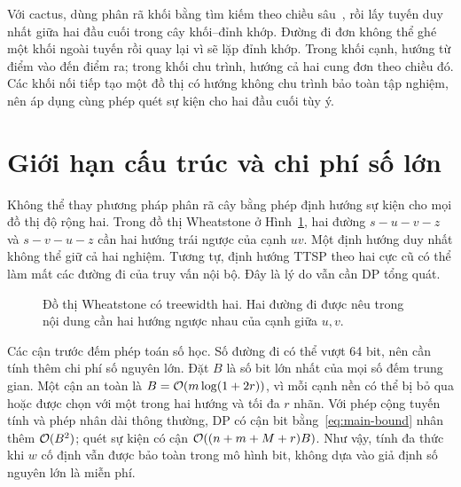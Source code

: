 Với cactus, dùng phân rã khối bằng tìm kiếm theo chiều sâu~\cite{tarjan1972}, rồi lấy tuyến duy nhất giữa hai đầu cuối trong cây khối--đỉnh khớp. Đường đi đơn không thể ghé một khối ngoài tuyến rồi quay lại vì sẽ lặp đỉnh khớp. Trong khối cạnh, hướng từ điểm vào đến điểm ra; trong khối chu trình, hướng cả hai cung đơn theo chiều đó. Các khối nối tiếp tạo một đồ thị có hướng không chu trình bảo toàn tập nghiệm, nên áp dụng cùng phép quét sự kiện cho hai đầu cuối tùy ý.

\section{Giới hạn cấu trúc và chi phí số lớn}

Không thể thay phương pháp phân rã cây bằng phép định hướng sự kiện cho mọi đồ thị độ rộng hai. Trong đồ thị Wheatstone ở Hình~\ref{fig:wheatstone}, hai đường $s-u-v-z$ và $s-v-u-z$ cần hai hướng trái ngược của cạnh $uv$. Một định hướng duy nhất không thể giữ cả hai nghiệm. Tương tự, định hướng TTSP theo hai cực cũ có thể làm mất các đường đi của truy vấn nội bộ. Đây là lý do vẫn cần DP tổng quát.

\begin{figure}[htbp]{Đồ thị Wheatstone có treewidth hai. Hai đường đi được nêu trong nội dung cần hai hướng ngược nhau của cạnh giữa $u,v$.}
\label{fig:wheatstone}
\centering
{}
\end{figure}

Các cận trước đếm phép toán số học. Số đường đi có thể vượt 64 bit, nên cần tính thêm chi phí số nguyên lớn. Đặt $B$ là số bit lớn nhất của mọi số đếm trung gian. Một cận an toàn là $B=\mathcal{O}(m\log(1+2r))$, vì mỗi cạnh nền có thể bị bỏ qua hoặc được chọn với một trong hai hướng và tối đa $r$ nhãn. Với phép cộng tuyến tính và phép nhân dài thông thường, DP có cận bit bằng~\eqref{eq:main-bound} nhân thêm $\mathcal{O}(B^2)$; quét sự kiện có cận $\mathcal{O}((n+m+M+r)B)$. Như vậy, tính đa thức khi $w$ cố định vẫn được bảo toàn trong mô hình bit, không dựa vào giả định số nguyên lớn là miễn phí.
